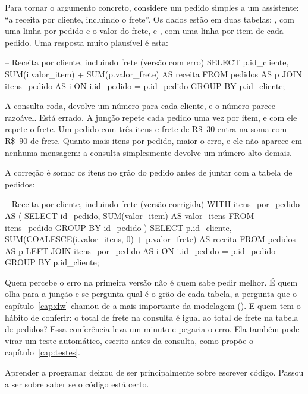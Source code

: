 Para tornar o argumento concreto, considere um pedido simples a um assistente: \enquote{a
receita por cliente, incluindo o frete}. Os dados estão em duas tabelas: ,
com uma linha por pedido e o valor do frete, e , com uma linha por item
de cada pedido. Uma resposta muito plausível é esta:

\begin{sql}
-- Receita por cliente, incluindo frete (versão com erro)
SELECT
    p.id_cliente,
    SUM(i.valor_item) + SUM(p.valor_frete) AS receita
FROM pedidos AS p
JOIN itens_pedido AS i ON i.id_pedido = p.id_pedido
GROUP BY p.id_cliente;
\end{sql}

A consulta roda, devolve um número para cada cliente, e o número parece razoável. Está
errado. A junção repete cada pedido uma vez por item, e com ele repete o frete. Um pedido
com três itens e frete de R\$~30 entra na soma com R\$~90 de frete. Quanto mais itens por
pedido, maior o erro, e ele não aparece em nenhuma mensagem: a consulta simplesmente
devolve um número alto demais.

A correção é somar os itens no grão do pedido antes de juntar com a tabela de pedidos:

\begin{sql}
-- Receita por cliente, incluindo frete (versão corrigida)
WITH itens_por_pedido AS (
    SELECT id_pedido, SUM(valor_item) AS valor_itens
    FROM itens_pedido
    GROUP BY id_pedido
)
SELECT
    p.id_cliente,
    SUM(COALESCE(i.valor_itens, 0) + p.valor_frete) AS receita
FROM pedidos AS p
LEFT JOIN itens_por_pedido AS i ON i.id_pedido = p.id_pedido
GROUP BY p.id_cliente;
\end{sql}

Quem percebe o erro na primeira versão não é quem sabe pedir melhor. É quem olha para a
junção e se pergunta qual é o grão de cada tabela, a pergunta que o
capítulo~\ref{cap:dw} chamou de a mais importante da modelagem ().
E quem tem o hábito de conferir: o total de frete na consulta é igual ao total de frete na
tabela de pedidos? Essa conferência leva um minuto e pegaria o erro. Ela também pode virar
um teste automático, escrito antes da consulta, como propõe o capítulo~\ref{cap:testes}.


\begin{destaque}
Aprender a programar deixou de ser principalmente sobre escrever código. Passou a ser
sobre saber se o código está certo.
\end{destaque}

